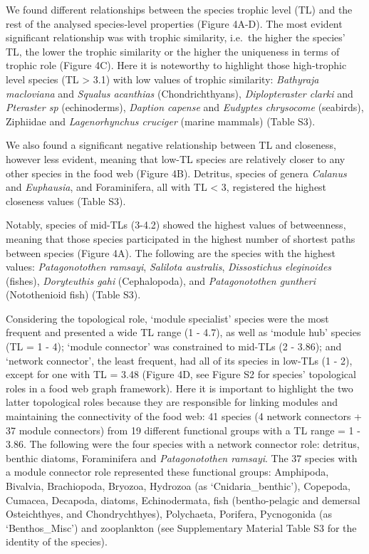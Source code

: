 \documentclass[preprint, 3p,
authoryear]{elsarticle} %
\begin{document}
We found different relationships between the species trophic level (TL)
and the rest of the analysed species-level properties (Figure 4A-D). The
most evident significant relationship was with trophic similarity,
i.e.~the higher the species' TL, the lower the trophic similarity or the
higher the uniqueness in terms of trophic role (Figure 4C). Here it is
noteworthy to highlight those high-trophic level species (TL
\textgreater{} 3.1) with low values of trophic similarity:
\emph{Bathyraja macloviana} and \emph{Squalus acanthias}
(Chondrichthyans), \emph{Diplopteraster clarki} and \emph{Pteraster sp}
(echinoderms), \emph{Daption capense} and \emph{Eudyptes chrysocome}
(seabirds), Ziphiidae and \emph{Lagenorhynchus cruciger} (marine
mammals) (Table S3).

We also found a significant negative relationship between TL and
closeness, however less evident, meaning that low-TL species are
relatively closer to any other species in the food web (Figure 4B).
Detritus, species of genera \emph{Calanus} and \emph{Euphausia}, and
Foraminifera, all with TL \textless{} 3, registered the highest
closeness values (Table S3).

Notably, species of mid-TLs (3-4.2) showed the highest values of
betweenness, meaning that those species participated in the highest
number of shortest paths between species (Figure 4A). The following are
the species with the highest values: \emph{Patagonotothen ramsayi},
\emph{Salilota australis}, \emph{Dissostichus eleginoides} (fishes),
\emph{Doryteuthis gahi} (Cephalopoda), and \emph{Patagonotothen
guntheri} (Notothenioid fish) (Table S3).

Considering the topological role, `module specialist' species were the
most frequent and presented a wide TL range (1 - 4.7), as well as
`module hub' species (TL = 1 - 4); `module connector' was constrained to
mid-TLs (2 - 3.86); and `network connector', the least frequent, had all
of its species in low-TLs (1 - 2), except for one with TL = 3.48 (Figure
4D, see Figure S2 for species' topological roles in a food web graph
framework). Here it is important to highlight the two latter topological
roles because they are responsible for linking modules and maintaining
the connectivity of the food web: 41 species (4 network connectors + 37
module connectors) from 19 different functional groups with a TL range =
1 - 3.86. The following were the four species with a network connector
role: detritus, benthic diatoms, Foraminifera and \emph{Patagonotothen
ramsayi}. The 37 species with a module connector role represented these
functional groups: Amphipoda, Bivalvia, Brachiopoda, Bryozoa, Hydrozoa
(as `Cnidaria\_benthic'), Copepoda, Cumacea, Decapoda, diatoms,
Echinodermata, fish (bentho-pelagic and demersal Osteichthyes, and
Chondrychthyes), Polychaeta, Porifera, Pycnogonida (as `Benthos\_Misc')
and zooplankton (see Supplementary Material Table S3 for the identity of
the species).
\end{document}
